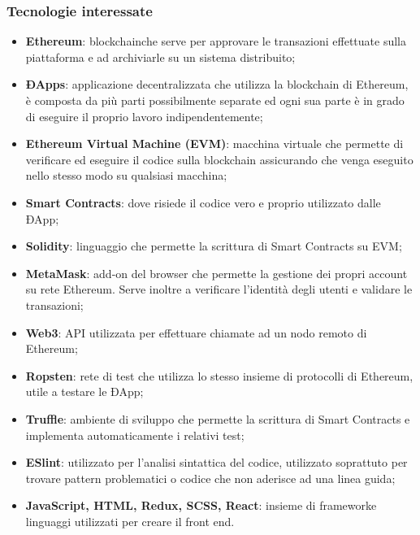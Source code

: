 \subsubsection{Tecnologie interessate}
\begin{itemize}
	\item \textbf{Ethereum}\glo: blockchain\glosp che serve per approvare le transazioni effettuate sulla piattaforma e ad archiviarle su un sistema distribuito; 
	\item \textbf{ÐApps}\glo: applicazione decentralizzata che utilizza la blockchain di Ethereum, è composta da più parti possibilmente separate ed ogni sua parte è in grado di eseguire il proprio lavoro indipendentemente; 
	\item \textbf{Ethereum Virtual Machine (EVM)}\glo: macchina virtuale che permette di verificare ed eseguire il codice sulla blockchain assicurando che venga eseguito nello stesso modo su qualsiasi macchina;
	\item \textbf{Smart Contracts}\glo: dove risiede il codice vero e proprio utilizzato dalle ÐApp;
	\item \textbf{Solidity}: linguaggio che permette la scrittura di Smart Contracts su EVM;
	\item \textbf{MetaMask}\glo: add-on del browser che permette la gestione dei propri account su rete Ethereum. Serve inoltre a verificare l'identità degli utenti e validare le transazioni;
	\item \textbf{Web3}: API utilizzata per effettuare chiamate ad un nodo remoto di Ethereum;
	\item\textbf{Ropsten}: rete di test che utilizza lo stesso insieme di protocolli di Ethereum, utile a testare le ÐApp;
	\item\textbf{Truffle}: ambiente di sviluppo che permette la scrittura di Smart Contracts e implementa automaticamente i relativi test;
	\item\textbf{ESlint\glo}: utilizzato per l'analisi sintattica del codice, utilizzato soprattuto per trovare pattern problematici o codice che non aderisce ad una linea guida;
	\item \textbf{JavaScript, HTML, Redux\glo, SCSS\glo, React\glo}: insieme di framework\glosp e linguaggi utilizzati per creare il front end.
\end{itemize}

